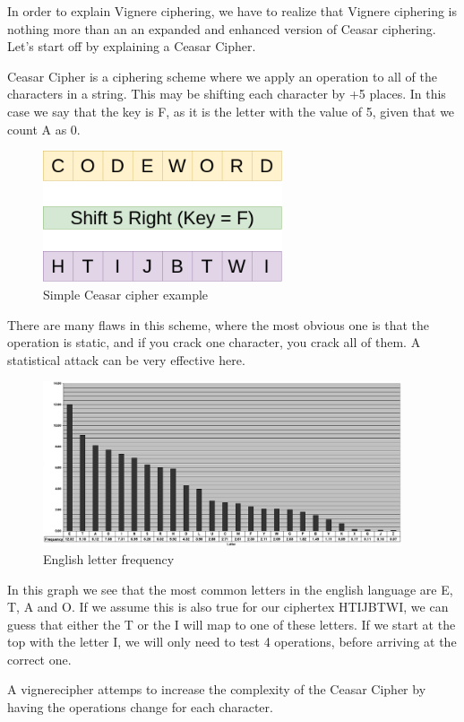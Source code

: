 \documentclass{article}
\begin{document}
In order to explain Vignere ciphering, we have to realize that Vignere ciphering is nothing more than an an expanded and enhanced version of Ceasar ciphering. Let's start off by explaining a Ceasar Cipher. 

Ceasar Cipher is a ciphering scheme where we apply an operation to all of the characters in a string. This may be shifting each character by +5 places. In this case we say that the key is F, as it is the letter with the value of 5, given that we count A as 0.

\begin{figure}[H]
 \centering
  \includegraphics[width=200pt]{img/ceasar.png}
 \caption{Simple Ceasar cipher example}
 \end{figure}

There are many flaws in this scheme, where the most obvious one is that the operation is static, and if you crack one character, you crack all of them. A statistical attack can be very effective here.

\begin{figure}[H]
 \centering
  \includegraphics[width=300pt]{img/frequency.jpg}
 \caption{English letter frequency\cite{LETTER}}
 \end{figure}

In this graph we see that the most common letters in the english language are E, T, A and O. If we assume this is also true for our ciphertex HTIJBTWI, we can guess that either the T or the I will map to one of these letters. If we start at the top with the letter I, we will only need to test 4 operations, before arriving at the correct one. 

A vignerecipher attemps to increase the complexity of the Ceasar Cipher by having the operations change for each character. 
\end{document}
